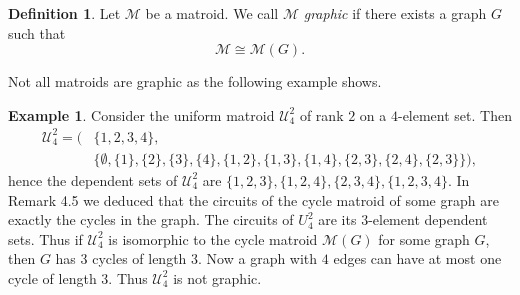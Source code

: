 \documentclass[12pt,a4paper, twoside, autooneside=false]{scrartcl}
\theoremstyle{definition}
\newtheorem{definition}[theorem]{Definition}
\newtheorem{beispiel}[theorem]{Example}
\theoremstyle{remark}
\numberwithin{equation}{section}
\newcommand{\M}{\mathcal{M}} %
\begin{document}
\begin{definition}
Let $\M$ be a matroid. We call $\M$ \textit{graphic} if there exists a graph $G$ such that \[
\M \cong \M(G).
\]
\end{definition}
Not all matroids are graphic as the following example shows.
\begin{beispiel}
Consider the uniform matroid $\mathcal{U}^2_4$ of rank $2$ on a $4$-element set. Then 
\begin{align*}
\mathcal{U}^2_4 = \bigg(&\bigg\{1,2,3,4\bigg\}, \\ 
  &\bigg\{\emptyset, \{1\}, \{2\}, \{3\}, \{4\}, \{1,2\}, \{1,3\}, \{1,4\}, \{2,3\}, \{2,4\}, \{2,3\}\bigg\}\bigg),
\end{align*}
hence the dependent sets of $\mathcal{U}^2_4$ are $\{1,2,3\}, \{1,2,4\}, \{2,3,4\}, \{1,2,3,4\}$. In Remark 4.5 we deduced that the circuits of the cycle matroid of some graph are exactly the cycles in the graph. The circuits of $U^2_4$ are its $3$-element dependent sets. Thus if $\mathcal{U}^2_4$ is isomorphic to the cycle matroid $\M(G)$ for some graph $G$, then $G$ has 3 cycles of length 3. Now a graph with $4$ edges can have at most one cycle of length $3$. Thus $\mathcal{U}^2_4$ is not graphic. 
\end{beispiel}
\end{document}
